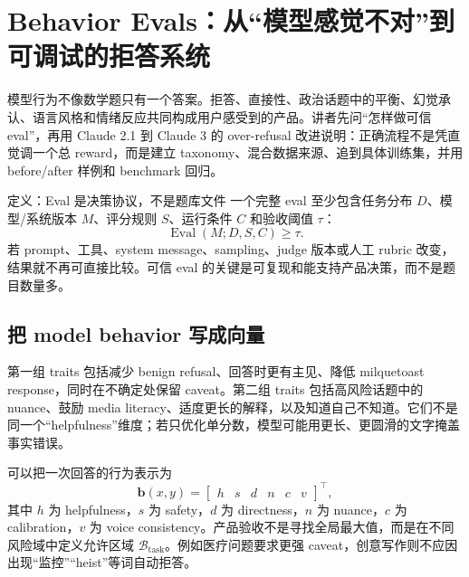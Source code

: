 \section{Behavior Evals：从“模型感觉不对”到可调试的拒答系统}

模型行为不像数学题只有一个答案。拒答、直接性、政治话题中的平衡、幻觉承认、语言风格和情绪反应共同构成用户感受到的产品。讲者先问“怎样做可信 eval”，再用 Claude 2.1 到 Claude 3 的 over-refusal 改进说明：正确流程不是凭直觉调一个总 reward，而是建立 taxonomy、混合数据来源、追到具体训练集，并用 before/after 样例和 benchmark 回归。


\begin{importantbox}{定义：Eval 是决策协议，不是题库文件}
一个完整 eval 至少包含任务分布 $D$、模型/系统版本 $M$、评分规则 $S$、运行条件 $C$ 和验收阈值 $\tau$：
\[
\operatorname{Eval}(M;D,S,C)\ge \tau.
\]
若 prompt、工具、system message、sampling、judge 版本或人工 rubric 改变，结果就不再可直接比较。可信 eval 的关键是可复现和能支持产品决策，而不是题目数量多。
\end{importantbox}

\subsection{把 model behavior 写成向量}

第一组 traits 包括减少 benign refusal、回答时更有主见、降低 milquetoast response，同时在不确定处保留 caveat。第二组 traits 包括高风险话题中的 nuance、鼓励 media literacy、适度更长的解释，以及知道自己不知道。它们不是同一个“helpfulness”维度；若只优化单分数，模型可能用更长、更圆滑的文字掩盖事实错误。



可以把一次回答的行为表示为
\[
\mathbf{b}(x,y)=
\begin{bmatrix}
h & s & d & n & c & v
\end{bmatrix}^{\top},
\]
其中 $h$ 为 helpfulness，$s$ 为 safety，$d$ 为 directness，$n$ 为 nuance，$c$ 为 calibration，$v$ 为 voice consistency。产品验收不是寻找全局最大值，而是在不同风险域中定义允许区域 $\mathcal{B}_{\text{task}}$。例如医疗问题要求更强 caveat，创意写作则不应因出现“监控”“heist”等词自动拒答。

